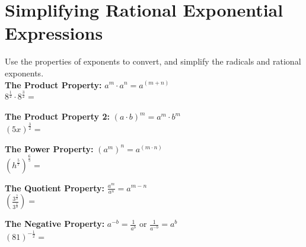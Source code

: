 \documentclass[12pt]{article}
\begin{document}
\pagebreak

\section{Simplifying Rational Exponential Expressions}
Use the properties of exponents to convert, and simplify the radicals and rational exponents. \\

\textbf{The Product Property:} $a^m\cdot a^n=a^{(m+n)}$\\

\hspace{1in} $8^{\frac{1}{2}} \cdot  8^{\frac{3}{2}}=$\\

\vspace{1cm}

\textbf{The Product Property 2:} $(a\cdot b)^m=a^m\cdot b^m$\\

\hspace{1in}$\left(5x\right)^{\frac{3}{2}}=$\\

\vspace{1cm}

\textbf{The Power Property:} $\left(a^m\right)^{n}=a^{(m\cdot n)}$\\

\hspace{1in} $\left(h^{\frac{5}{7}}\right)^{\frac{6}{5}}=$\\

\vspace{1cm}

\textbf{The Quotient Property:} $\frac{a^m}{a^n}=a^{m-n}$\\

\hspace{1in} $\left(\frac{3^{\frac{3}{2}}}{3^{\frac{1}{2}}}\right)=$\\

\vspace{1cm}

\textbf{The Negative Property:} $a^{-b}=\frac{1}{a^{b}}$ \hspace{1cm} or \hspace{1cm} $\frac{1}{a^{-b}}=a^b$\\

\hspace{1in} $(81)^{-\frac{1}{2}}=$\\

\vspace{1cm}
\end{document}
